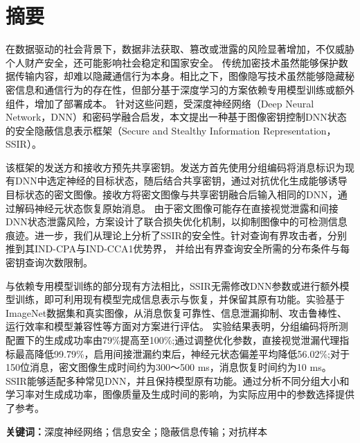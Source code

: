 \clearpage
\section*{摘要}
在数据驱动的社会背景下，数据非法获取、篡改或泄露的风险显著增加，不仅威胁个人财产安全，还可能影响社会稳定和国家安全。
传统加密技术虽然能够保护数据传输内容，却难以隐藏通信行为本身。相比之下，图像隐写技术虽然能够隐藏秘密信息和通信行为的存在性，但部分基于深度学习的方案依赖专用模型训练或额外组件，增加了部署成本。
针对这些问题，受深度神经网络（Deep Neural Network，DNN）和密码学融合启发，本文提出一种基于图像密钥控制DNN状态的安全隐蔽信息表示框架（Secure and Stealthy Information Representation，SSIR）。

该框架的发送方和接收方预先共享密钥。发送方首先使用分组编码将消息标识为现有DNN中选定神经的目标状态，随后结合共享密钥，通过对抗优化生成能够诱导目标状态的密文图像。接收方将密文图像与共享密钥融合后输入相同的DNN，通过解码神经元状态恢复原始消息。
由于密文图像可能存在直接视觉泄露和间接DNN状态泄露风险，方案设计了联合损失优化机制，以抑制图像中的可检测信息痕迹。进一步，我们从理论上分析了SSIR的安全性。针对查询有界攻击者，分别推到其IND-CPA与IND-CCA1优势界，
并给出有界查询安全所需的分布条件与每密钥查询次数限制。

与依赖专用模型训练的部分现有方法相比，SSIR无需修改DNN参数或进行额外模型训练，即可利用现有模型完成信息表示与恢复，并保留其原有功能。实验基于ImageNet数据集和真实图像，从消息恢复可靠性、信息泄漏抑制、攻击鲁棒性、运行效率和模型兼容性等方面对方案进行评估。
实验结果表明，分组编码将所测配置下的生成成功率由79\%提高至100\%;通过调整优化参数，直接视觉泄漏代理指标最高降低99.79\%，启用间接泄漏约束后，神经元状态偏差平均降低56.02\%;对于150位消息，密文图像生成时间约为300～500 ms，消息恢复时间约为10 ms。
SSIR能够适配多种常见DNN，并且保持模型原有功能。通过分析不同分组大小和学习率对生成成功率，图像质量及生成时间的影响，为实际应用中的参数选择提供了参考。

\vspace{\baselineskip}
\noindent\textbf{关键词：}深度神经网络；信息安全；隐蔽信息传输；对抗样本